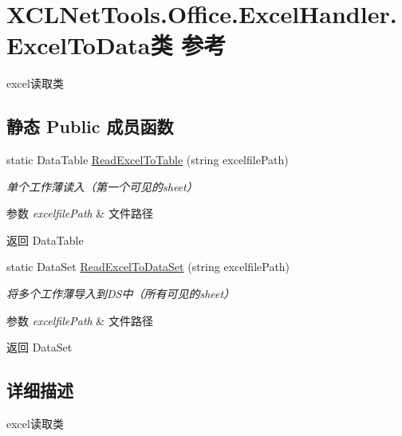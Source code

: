 \hypertarget{class_x_c_l_net_tools_1_1_office_1_1_excel_handler_1_1_excel_to_data}{\section{X\-C\-L\-Net\-Tools.\-Office.\-Excel\-Handler.\-Excel\-To\-Data类 参考}
\label{class_x_c_l_net_tools_1_1_office_1_1_excel_handler_1_1_excel_to_data}
}


excel读取类  


\subsection*{静态 Public 成员函数}
\begin{DoxyCompactItemize}
\item 
static Data\-Table \hyperlink{class_x_c_l_net_tools_1_1_office_1_1_excel_handler_1_1_excel_to_data_a1212af867d849c5763dba02910d76ee9}{Read\-Excel\-To\-Table} (string excelfile\-Path)
\begin{DoxyCompactList}\small\item\em 单个工作薄读入（第一个可见的sheet） 
\begin{DoxyParams}{参数}
{\em excelfile\-Path} & 文件路径\\
\hline
\end{DoxyParams}
\begin{DoxyReturn}{返回}
Data\-Table
\end{DoxyReturn}
\end{DoxyCompactList}\item 
static Data\-Set \hyperlink{class_x_c_l_net_tools_1_1_office_1_1_excel_handler_1_1_excel_to_data_a526b1ce8805df33d0dbf8b432b6570cc}{Read\-Excel\-To\-Data\-Set} (string excelfile\-Path)
\begin{DoxyCompactList}\small\item\em 将多个工作薄导入到\-D\-S中（所有可见的sheet） 
\begin{DoxyParams}{参数}
{\em excelfile\-Path} & 文件路径\\
\hline
\end{DoxyParams}
\begin{DoxyReturn}{返回}
Data\-Set
\end{DoxyReturn}
\end{DoxyCompactList}\end{DoxyCompactItemize}


\subsection{详细描述}
excel读取类 



